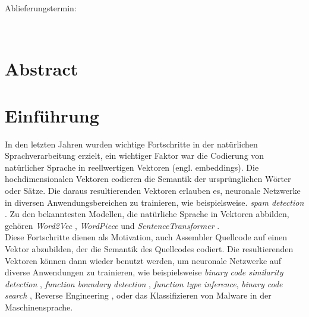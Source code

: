 \documentclass[12pt,letterpaper,ngerman]{article}
\begin{document}
\begin{center}
\begin{large}
Ablieferungstermin: \date{\today} \\
\end{large}
\end{center}

\vspace{1,5cm}

\newpage
\tableofcontents
\newpage

\setcounter{page}{1}
\pagestyle{fancy}
\fancyhf{}
\fancyhead[R]{\thepage}
\renewcommand{\headrulewidth}{0pt} %
\newtheorem{definition}{Definition}
\section*{Abstract}
\section{Einführung}
In den letzten Jahren wurden wichtige Fortschritte in der natürlichen
Sprachverarbeitung erzielt, ein wichtiger Faktor war die Codierung von
natürlicher Sprache in reellwertigen Vektoren (engl. embeddings). Die hochdimensionalen Vektoren
codieren die Semantik der ursprünglichen Wörter oder Sätze. Die daraus 
resultierenden Vektoren erlauben es, neuronale Netzwerke in diversen 
Anwendungsbereichen zu trainieren, wie beispielsweise. 
\textit{spam detection} \cite{Ball2019}.  
Zu den bekanntesten Modellen, die natürliche Sprache in Vektoren abbilden, gehören 
\textit{Word2Vec} \cite{mikolov2013efficientestimationwordrepresentations},
\textit{WordPiece} \cite{wu2016googlesneuralmachinetranslation} und
\textit{SentenceTransformer} \cite{reimers2019sentencebertsentenceembeddingsusing}.\\

Diese Fortschritte dienen als Motivation, auch Assembler Quellcode auf einen 
Vektor abzubilden, der die Semantik des Quellcodes codiert. Die resultierenden
Vektoren können dann wieder benutzt werden, um neuronale Netzwerke auf
diverse Anwendungen zu trainieren, wie beispielsweise
\textit{binary code similarity detection} \cite{wang2022jtransjumpawaretransformerbinary},
\textit{function boundary detection} \cite{190918},
\textit{function type inference}\cite{203650},
\textit{binary code search} \cite{9345532},
Reverse Engineering \cite{lacomis2019direneuralapproachdecompiled},
oder das Klassifizieren von 
Malware in der Maschinensprache\cite{raff2017malwaredetectioneatingexe}.\\
\end{document}
